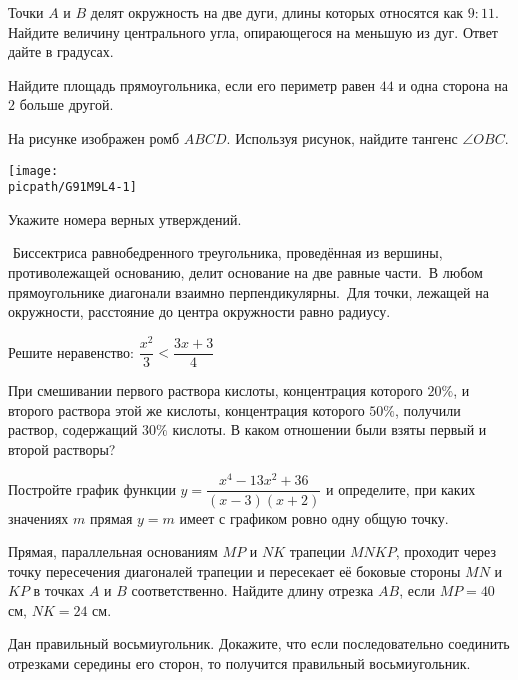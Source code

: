 \begin{class}[number=4]
\begin{listofex}
		\item Точки \(A\) и \(B\) делят окружность на две дуги, длины которых относятся как \(9:11\). Найдите величину центрального угла, опирающегося на меньшую из дуг. Ответ дайте в градусах.
		\item Найдите площадь прямоугольника, если его периметр равен \(44\) и одна сторона на \(2\) больше другой.
		\item На рисунке изображен ромб \(ABCD\). Используя рисунок, найдите  тангенс \(\angle OBC\).
		\begin{center}
			\texttt{[image: \\picpath/G91M9L4-1]}
		\end{center}
		\item Укажите номера верных утверждений.
		\begin{tasks}
			\task  Биссектриса равнобедренного треугольника, проведённая из вершины, противолежащей основанию, делит основание на две равные части.
			\task В любом прямоугольнике диагонали взаимно перпендикулярны.
			\task Для точки, лежащей на окружности, расстояние до центра окружности равно радиусу.
		\end{tasks}
		\item Решите неравенство: \(\dfrac{ x^2 }{ 3 }<\dfrac{ 3x+3 }{ 4 }\)
		\item При смешивании первого раствора кислоты, концентрация которого \(20\%\), и второго раствора этой же кислоты, концентрация которого \(50\%\), получили раствор, содержащий \(30\%\) кислоты. В каком отношении были взяты первый и второй растворы?
		\item Постройте график функции \(y=\dfrac{ x^4-13x^2+36 }{ (x-3)(x+2) }\) и определите, при каких значениях \(m\) прямая \(y=m\) имеет с графиком ровно одну общую точку.
		\item Прямая, параллельная основаниям \(MP\) и \(NK\) трапеции \(MNKP\), проходит через точку пересечения диагоналей трапеции и пересекает её боковые стороны \(MN\) и \(KP\) в точках  \(A\) и \(B\) соответственно. Найдите длину отрезка \(AB\), если \(MP=40\) см, \(NK=24\) см.
		\item Дан правильный восьмиугольник. Докажите, что если последовательно соединить отрезками середины его сторон, то получится правильный восьмиугольник.
	\end{listofex}
\end{class}


